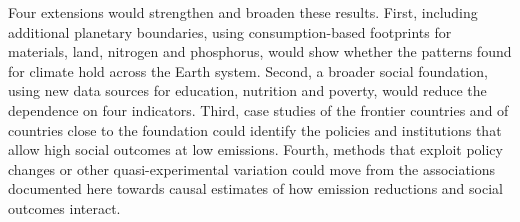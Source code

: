 Four extensions would strengthen and broaden these results. First, including additional planetary boundaries, using consumption-based footprints for materials, land, nitrogen and phosphorus, would show whether the patterns found for climate hold across the Earth system. Second, a broader social foundation, using new data sources for education, nutrition and poverty, would reduce the dependence on four indicators. Third, case studies of the frontier countries and of countries close to the foundation could identify the policies and institutions that allow high social outcomes at low emissions. Fourth, methods that exploit policy changes or other quasi-experimental variation could move from the associations documented here towards causal estimates of how emission reductions and social outcomes interact.
